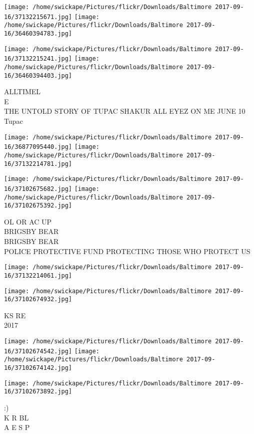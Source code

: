 \documentclass[10pt,letterpaper]{article}
\begin{document}
\texttt{[image: /home/swickape/Pictures/flickr/Downloads/Baltimore 2017-09-16/37132215671.jpg]}
\texttt{[image: /home/swickape/Pictures/flickr/Downloads/Baltimore 2017-09-16/36460394783.jpg]}

\texttt{[image: /home/swickape/Pictures/flickr/Downloads/Baltimore 2017-09-16/37132215241.jpg]}
\texttt{[image: /home/swickape/Pictures/flickr/Downloads/Baltimore 2017-09-16/36460394403.jpg]}

ALLTIMEL\\
E\\
THE UNTOLD STORY OF TUPAC SHAKUR ALL EYEZ ON  ME JUNE 10\\
Tupac
\pagebreak

\texttt{[image: /home/swickape/Pictures/flickr/Downloads/Baltimore 2017-09-16/36877095440.jpg]}
\texttt{[image: /home/swickape/Pictures/flickr/Downloads/Baltimore 2017-09-16/37132214781.jpg]}

\texttt{[image: /home/swickape/Pictures/flickr/Downloads/Baltimore 2017-09-16/37102675682.jpg]}
\texttt{[image: /home/swickape/Pictures/flickr/Downloads/Baltimore 2017-09-16/37102675392.jpg]}

OL OR AC UP\\
BRIGSBY BEAR\\
BRIGSBY BEAR\\
POLICE PROTECTIVE FUND PROTECTING THOSE WHO PROTECT US
\pagebreak

\texttt{[image: /home/swickape/Pictures/flickr/Downloads/Baltimore 2017-09-16/37132214061.jpg]}

\vspace{0.25in}
\texttt{[image: /home/swickape/Pictures/flickr/Downloads/Baltimore 2017-09-16/37102674932.jpg]}

KS RE\\
2017
\pagebreak

\texttt{[image: /home/swickape/Pictures/flickr/Downloads/Baltimore 2017-09-16/37102674542.jpg]}
\texttt{[image: /home/swickape/Pictures/flickr/Downloads/Baltimore 2017-09-16/37102674142.jpg]}

\texttt{[image: /home/swickape/Pictures/flickr/Downloads/Baltimore 2017-09-16/37102673892.jpg]}

:)\\
K R BL\\
A E S P
\pagebreak
\end{document}
